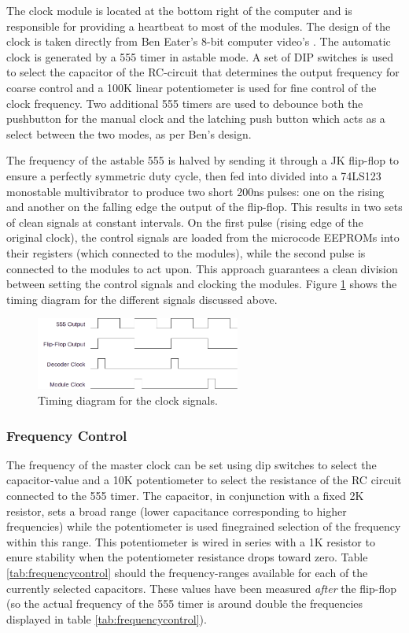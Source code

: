 The clock module is located at the bottom right of the computer and is responsible for providing a heartbeat to most of the modules. The design of the clock is taken directly from Ben Eater's 8-bit computer video's \cite{beneater}. The automatic clock is generated by a 555 timer in astable mode. A set of DIP switches is used to select the capacitor of the RC-circuit that determines the output frequency for coarse control and a 100K linear potentiometer is used for fine control of the clock frequency. Two additional 555 timers are used to debounce both the pushbutton for the manual clock and the latching push button which acts as a select between the two modes, as per Ben's design. 

The frequency of the astable 555 is halved by sending it through a JK flip-flop to ensure a perfectly symmetric duty cycle, then fed into divided into a 74LS123 monostable multivibrator to produce two short 200ns pulses: one on the rising and another on the falling edge the output of the flip-flop. This results in two sets of clean signals at constant intervals. On the first pulse (rising edge of the original clock), the control signals are loaded from the microcode EEPROMs into their registers (which connected to the modules), while the second pulse is connected to the modules to act upon. This approach guarantees a clean division between setting the control signals and clocking the modules. Figure \ref{fig:clocktiming} shows the timing diagram for the different signals discussed above.

\begin{figure}[H]
  \centering
  \includegraphics[width=0.6\textwidth]{img/clocktiming}
  \caption{Timing diagram for the clock signals.}
  \label{fig:clocktiming}
\end{figure}

\subsubsection{Frequency Control}
The frequency of the master clock can be set using dip switches to select the capacitor-value and a 10K potentiometer to select the resistance of the RC circuit connected to the 555 timer. The capacitor, in conjunction with a fixed 2K resistor, sets a broad range (lower capacitance corresponding to higher frequencies) while the potentiometer is used finegrained selection of the frequency within this range. This potentiometer is wired in series with a 1K resistor to enure stability when the potentiometer resistance drops toward zero. Table \ref{tab:frequencycontrol} should the frequency-ranges available for each of the currently selected capacitors. These values have been measured \emph{after} the flip-flop (so the actual frequency of the 555 timer is around double the frequencies displayed in table \ref{tab:frequencycontrol}).

